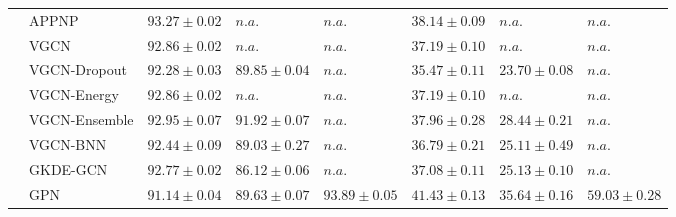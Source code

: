 \begin{table}[ht]
{\begin{tabular}{ll|lll|lll}
      &          APPNP &    $93.27 \pm 0.02$ &               $n.a.$ &                $n.a.$ &   $38.14 \pm 0.09$ &              $n.a.$ &               $n.a.$ \\
      &           VGCN &    $92.86 \pm 0.02$ &               $n.a.$ &                $n.a.$ &   $37.19 \pm 0.10$ &              $n.a.$ &               $n.a.$ \\
      &   VGCN-Dropout &    $92.28 \pm 0.03$ &    $89.85 \pm 0.04$ &                $n.a.$ &   $35.47 \pm 0.11$ &   $23.70 \pm 0.08$ &               $n.a.$ \\
      &    VGCN-Energy &    $92.86 \pm 0.02$ &               $n.a.$ &                $n.a.$ &   $37.19 \pm 0.10$ &              $n.a.$ &               $n.a.$ \\
      &  VGCN-Ensemble &    $92.95 \pm 0.07$ &    $91.92 \pm 0.07$ &                $n.a.$ &   $37.96 \pm 0.28$ &   $28.44 \pm 0.21$ &               $n.a.$ \\
      &       VGCN-BNN &    $92.44 \pm 0.09$ &    $89.03 \pm 0.27$ &                $n.a.$ &   $36.79 \pm 0.21$ &   $25.11 \pm 0.49$ &               $n.a.$ \\
      &        GKDE-GCN &    $92.77 \pm 0.02$ &    $86.12 \pm 0.06$ &                $n.a.$ &   $37.08 \pm 0.11$ &   $25.13 \pm 0.10$ &               $n.a.$ \\
      &            GPN &    $91.14 \pm 0.04$ &    $89.63 \pm 0.07$ &     $\mathbf{93.89 \pm 0.05}$ &   $41.43 \pm 0.13$ &   $35.64 \pm 0.16$ &    $\mathbf{59.03 \pm 0.28}$ \\
          
          \midrule
          

\end{tabular}}
\end{table}
